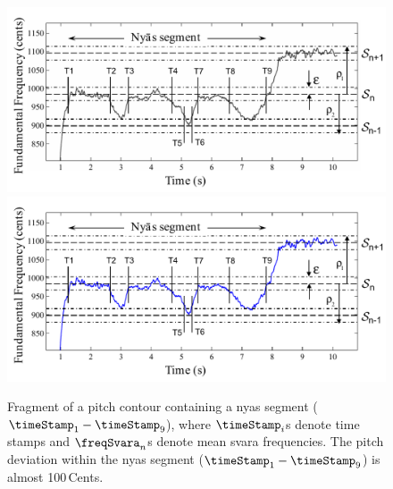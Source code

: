 {\begin{figure}
	\begin{center}
		\ifdefined\PRINTVER
			\includegraphics[width=\figSizeNinety]{ch05_preprocessing/figures/NyasSegmentationMethod_BW.pdf}
		\else
			\includegraphics[width=\figSizeNinety]{ch05_preprocessing/figures/NyasSegmentationMethod.pdf}
		\fi
	\end{center}
	\caption[Illustration of \gls{nyas} segmentation process]{Fragment of a pitch contour containing a \gls{nyas} segment ($\timeStamp_1-\timeStamp_9$), where $\timeStamp_i$s denote time stamps and $\freqSvara_n$s denote mean \gls{svara} frequencies. The pitch deviation within the \gls{nyas} segment ($\timeStamp_1-\timeStamp_9$) is almost 100\,Cents.}
	\label{fig:nyas_segmentation_illustration}
\end{figure}

}
